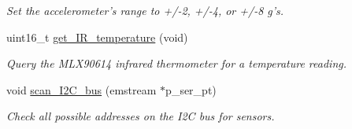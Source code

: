 \begin{DoxyCompactItemize}
\begin{DoxyCompactList}\small\item\em Set the accelerometer's range to +/-\/2, +/-\/4, or +/-\/8 g's. \end{DoxyCompactList}\item 
uint16\-\_\-t \hyperlink{classpolydaq2_afac7f21b84a613f3aac3cd9f11a08654}{get\-\_\-\-I\-R\-\_\-temperature} (void)
\begin{DoxyCompactList}\small\item\em Query the M\-L\-X90614 infrared thermometer for a temperature reading. \end{DoxyCompactList}\item 
void \hyperlink{classpolydaq2_a42de5e039a7715870237630a2d7ba608}{scan\-\_\-\-I2\-C\-\_\-bus} (emstream $\ast$p\-\_\-ser\-\_\-pt)
\begin{DoxyCompactList}\small\item\em Check all possible addresses on the I2\-C bus for sensors. \end{DoxyCompactList}\end{DoxyCompactItemize}

